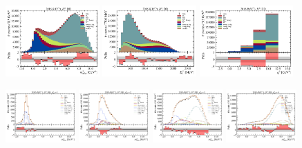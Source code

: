 \begin{figure}[htb]
    \centering
    \includegraphics[width=0.32\textwidth]{./figs-supplemental-plots/pre-ctrl-fit/stacked/fit_result-stacked-D0-dd-mmiss2.pdf}
    \includegraphics[width=0.32\textwidth]{./figs-supplemental-plots/pre-ctrl-fit/stacked/fit_result-stacked-D0-dd-el.pdf}
    \includegraphics[width=0.32\textwidth]{./figs-supplemental-plots/pre-ctrl-fit/stacked/fit_result-stacked-D0-dd-q2.pdf}

    \includegraphics[width=0.24\textwidth]{./figs-supplemental-plots/pre-ctrl-fit/lines_q2_slices/fit_result-lines_q2_idx1-D0-dd-mmiss2.pdf}
    \includegraphics[width=0.24\textwidth]{./figs-supplemental-plots/pre-ctrl-fit/lines_q2_slices/fit_result-lines_q2_idx2-D0-dd-mmiss2.pdf}
    \includegraphics[width=0.24\textwidth]{./figs-supplemental-plots/pre-ctrl-fit/lines_q2_slices/fit_result-lines_q2_idx3-D0-dd-mmiss2.pdf}
    \includegraphics[width=0.24\textwidth]{./figs-supplemental-plots/pre-ctrl-fit/lines_q2_slices/fit_result-lines_q2_idx4-D0-dd-mmiss2.pdf}


\end{figure}
